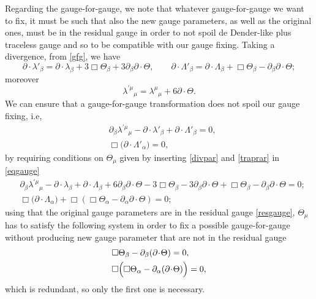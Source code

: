 \documentclass[a4paper,12pt]{article}
\begin{document}
Regarding the gauge-for-gauge, we note that whatever gauge-for-gauge we want to fix, it must be such that also the new gauge parameters, as well as the original ones, must be in the residual gauge in order to not spoil de Dender-like plus traceless gauge and so to be compatible with our gauge fixing. Taking a divergence, from \eqref{gfg}, we have
\begin{equation}
    \partial \cdot \lambda'_{\beta}=\partial \cdot \lambda_{\beta}+3\Box\Theta_{\beta}+3\partial_{\beta}\partial \cdot\Theta, \qquad \partial \cdot \Lambda'_{\beta}=\partial \cdot \Lambda_{\beta}+\Box\Theta_{\beta}-\partial_{\beta}\partial \cdot\Theta;
    \label{divpar}
\end{equation}
moreover
\begin{equation}
    \lambda^{'\mu}{}_{\mu}=\lambda^{\mu}{}_{\mu}+6\partial \cdot \Theta.
    \label{traprar}
\end{equation}
We can ensure that a gauge-for-gauge transformation does not spoil our gauge fixing, i.e,
\begin{equation}
\begin{aligned}
     &\partial_{\beta}\lambda^{'\mu}{}_{\mu}
-\partial\!\cdot\!\lambda'_{\beta}
+\partial\!\cdot\!\Lambda'_{\beta}=0,\\
&\Box\bigl(\partial\!\cdot\!\Lambda'_{\alpha}\bigr)=0,
\label{eqgauge}
\end{aligned}
\end{equation}
by requiring conditions on $\Theta_{\mu}$ given by inserting \eqref{divpar} and \eqref{traprar} in \eqref{eqgauge}
\begin{equation}
\begin{aligned}
    &\partial_{\beta}\lambda^{'\mu}{}_{\mu}
-\partial\!\cdot\!\lambda_{\beta}
+\partial\!\cdot\!\Lambda_{\beta} + 6 \partial_{\beta} \partial \cdot \Theta -3\Box \Theta_{\beta}-3 \partial_{\beta} \partial \cdot \Theta+\Box \Theta_{\beta} -\partial_{\beta} \partial \cdot \Theta=0;\\
&\Box\bigl(\partial\!\cdot\!\Lambda_{\alpha}\bigr)+\Box(\Box \Theta_{\alpha} -\partial_{\alpha} \partial \cdot \Theta)=0;
\end{aligned}
\end{equation}
using that the original gauge parameters are in the residual gauge \eqref{resgauge}, $\Theta_{\mu}$ has to satisfy the following system in order to fix a possible gauge-for-gauge without producing new gauge parameter that are not in the residual gauge 
\begin{equation}
\begin{aligned}
&\Box\Theta_\beta-\partial_\beta(\partial\!\cdot\!\Theta)=0,\\    
&\Box\Bigl(\Box\Theta_\alpha-\partial_\alpha(\partial\!\cdot\!\Theta)\Bigr)=0 ,
\label{comp}
\end{aligned}
\end{equation}
which is redundant, so only the first one is necessary. 
\end{document}
